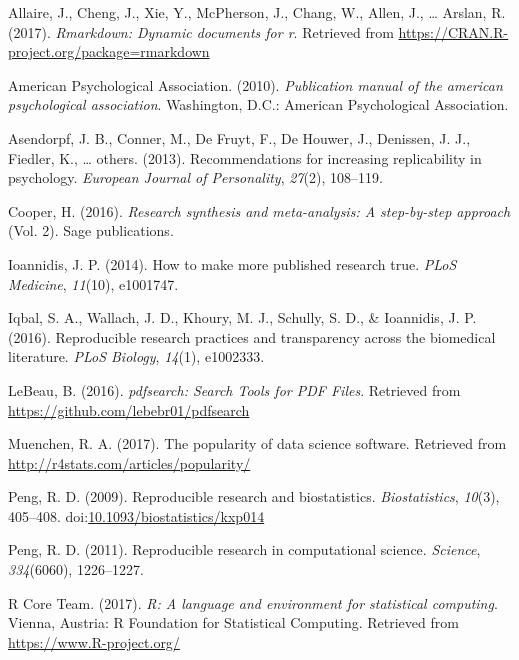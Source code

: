 \documentclass[english,man]{apa6}
\theoremstyle{definition}
\theoremstyle{definition}
\theoremstyle{definition}
\theoremstyle{remark}
\begin{document}
\hypertarget{refs}{}
\leavevmode\hypertarget{ref-rmarkdown}{}%
Allaire, J., Cheng, J., Xie, Y., McPherson, J., Chang, W., Allen, J.,
\ldots{} Arslan, R. (2017). \emph{Rmarkdown: Dynamic documents for r}.
Retrieved from \url{https://CRAN.R-project.org/package=rmarkdown}

\leavevmode\hypertarget{ref-apa}{}%
American Psychological Association. (2010). \emph{Publication manual of
the american psychological association}. Washington, D.C.: American
Psychological Association.

\leavevmode\hypertarget{ref-asendorpf2013}{}%
Asendorpf, J. B., Conner, M., De Fruyt, F., De Houwer, J., Denissen, J.
J., Fiedler, K., \ldots{} others. (2013). Recommendations for increasing
replicability in psychology. \emph{European Journal of Personality},
\emph{27}(2), 108--119.

\leavevmode\hypertarget{ref-cooper2016}{}%
Cooper, H. (2016). \emph{Research synthesis and meta-analysis: A
step-by-step approach} (Vol. 2). Sage publications.

\leavevmode\hypertarget{ref-ioannidis2014}{}%
Ioannidis, J. P. (2014). How to make more published research true.
\emph{PLoS Medicine}, \emph{11}(10), e1001747.

\leavevmode\hypertarget{ref-iqbal2016}{}%
Iqbal, S. A., Wallach, J. D., Khoury, M. J., Schully, S. D., \&
Ioannidis, J. P. (2016). Reproducible research practices and
transparency across the biomedical literature. \emph{PLoS Biology},
\emph{14}(1), e1002333.

\leavevmode\hypertarget{ref-pdfsearch}{}%
LeBeau, B. (2016). \emph{pdfsearch: Search Tools for PDF Files}.
Retrieved from \url{https://github.com/lebebr01/pdfsearch}

\leavevmode\hypertarget{ref-muenchen}{}%
Muenchen, R. A. (2017). The popularity of data science software.
Retrieved from \url{http://r4stats.com/articles/popularity/}

\leavevmode\hypertarget{ref-peng2009}{}%
Peng, R. D. (2009). Reproducible research and biostatistics.
\emph{Biostatistics}, \emph{10}(3), 405--408.
doi:\href{https://doi.org/10.1093/biostatistics/kxp014}{10.1093/biostatistics/kxp014}

\leavevmode\hypertarget{ref-peng2011}{}%
Peng, R. D. (2011). Reproducible research in computational science.
\emph{Science}, \emph{334}(6060), 1226--1227.

\leavevmode\hypertarget{ref-rpro}{}%
R Core Team. (2017). \emph{R: A language and environment for statistical
computing}. Vienna, Austria: R Foundation for Statistical Computing.
Retrieved from \url{https://www.R-project.org/}
\end{document}

